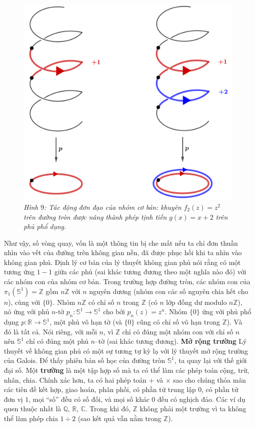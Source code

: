 \begin{multicols}{2}
\begin{figure}[H]
		\includegraphics[width= 0.7\linewidth]{h9.png}
		\caption{\small\textit{\color{duongvaotoanhoc}Hình $9$: Tác động đơn đạo của nhóm cơ bản: khuyên $f_2(z) = z^2$ trên đường tròn được nâng thành phép tịnh tiến $g(x) = x+2$ trên phủ phổ dụng.}}
		\vspace*{-10pt}
	\end{figure}
	Như vậy, số vòng quay, vốn là một thông tin bị che mất nếu ta chỉ đơn thuần nhìn vào vết của đường trên không gian nền, đã được phục hồi khi ta nhìn vào không gian phủ.
	\vskip 0.1cm
	Định lý cơ bản của lý thuyết không gian phủ nói rằng có một tương ứng $1-1$ giữa các phủ (sai khác tương đương theo một nghĩa nào đó) với các nhóm con của nhóm cơ bản. Trong trường hợp đường tròn, các nhóm con của $\pi_1(\mathbb{S}^1) = \mathbb{Z}$ gồm $n\mathbb{Z}$ với $n$ nguyên dương (nhóm con các số nguyên chia hết cho $n$), cùng với $\{0\}$. Nhóm $n\mathbb{Z}$ có chỉ số $n$ trong $\mathbb{Z}$ (có $n$ lớp đồng dư modulo $n\mathbb{Z}$), nó ứng với phủ $n$-tờ $p_n: \mathbb{S}^1 \to \mathbb{S}^1$ cho bởi $p_n(z) = z^n$. Nhóm $\{0\}$ ứng với phủ phổ dụng $p: \mathbb{R} \to \mathbb{S}^1$, một phủ vô hạn tờ (và $\{0\}$ cũng có chỉ số vô hạn trong $\mathbb{Z}$). Và đó là tất cả. Nói riêng, với mỗi $n$, vì $\mathbb{Z}$ chỉ có đúng một nhóm con với chỉ số $n$ nên $\mathbb{S}^1$ chỉ có đúng một phủ $n$--tờ (sai khác tương đương).
	\vskip 0.1cm
	\textbf{\color{duongvaotoanhoc}Mở rộng trường}
	\vskip 0.1cm
	Lý thuyết về không gian phủ có một sự tương tự kỳ lạ với lý thuyết mở rộng trường của Galois. Để thấy phiên bản số học của đường tròn $\mathbb{S}^1$, ta quay lại với thế giới đại số. Một {\bf\color{duongvaotoanhoc} trường} là một tập hợp số mà ta có thể làm các phép toán cộng, trừ, nhân, chia. Chính xác hơn, ta có hai phép toán $+$ và $\times$ sao cho chúng thỏa mãn các tiên đề kết hợp, giao hoán, phân phối, có phần tử trung lập $0$, có phần tử đơn vị $1$, mọi ``số'' đều có số đối, và mọi số khác $0$ đều có nghịch đảo. Các ví dụ quen thuộc nhất là $\mathbb{Q}$, $\mathbb{R}$, $\mathbb{C}$. Trong khi đó, $\mathbb{Z}$ không phải một trường vì ta không thể làm phép chia $1 \div 2$ (sao kết quả vẫn nằm trong $\mathbb{Z}$).

\end{multicols}
